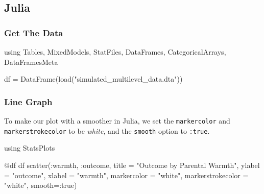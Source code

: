 \documentclass[
  letterpaper,
  DIV=11,
  numbers=noendperiod]{scrreprt}
\newenvironment{Shaded}{\begin{snugshade}}{\end{snugshade}}
\newcommand{\BuiltInTok}[1]{\textcolor[rgb]{0.00,0.23,0.31}{#1}}
\newcommand{\ConstantTok}[1]{\textcolor[rgb]{0.56,0.35,0.01}{#1}}
\newcommand{\FunctionTok}[1]{\textcolor[rgb]{0.28,0.35,0.67}{#1}}
\newcommand{\ImportTok}[1]{\textcolor[rgb]{0.00,0.46,0.62}{#1}}
\newcommand{\NormalTok}[1]{\textcolor[rgb]{0.00,0.23,0.31}{#1}}
\newcommand{\OperatorTok}[1]{\textcolor[rgb]{0.37,0.37,0.37}{#1}}
\newcommand{\PreprocessorTok}[1]{\textcolor[rgb]{0.68,0.00,0.00}{#1}}
\newcommand{\StringTok}[1]{\textcolor[rgb]{0.13,0.47,0.30}{#1}}
\begin{document}
\subsection{Julia}

\subsubsection{Get The Data}\label{get-the-data-5}

\begin{Shaded}
\begin{Highlighting}[]
\ImportTok{using} \BuiltInTok{Tables}\NormalTok{, }\BuiltInTok{MixedModels}\NormalTok{, }\BuiltInTok{StatFiles}\NormalTok{, }\BuiltInTok{DataFrames}\NormalTok{, }\BuiltInTok{CategoricalArrays}\NormalTok{, }\BuiltInTok{DataFramesMeta}

\NormalTok{df }\OperatorTok{=} \FunctionTok{DataFrame}\NormalTok{(}\FunctionTok{load}\NormalTok{(}\StringTok{"simulated\_multilevel\_data.dta"}\NormalTok{))}
\end{Highlighting}
\end{Shaded}

\subsubsection{Line Graph}\label{line-graph-2}

To make our plot with a smoother in Julia, we set the
\texttt{markercolor} and \texttt{markerstrokecolor} to be \emph{white},
and the \texttt{smooth} option to \texttt{:true}.

\begin{Shaded}
\begin{Highlighting}[]
\ImportTok{using} \BuiltInTok{StatsPlots}

\PreprocessorTok{@df}\NormalTok{ df }\FunctionTok{scatter}\NormalTok{(}\OperatorTok{:}\NormalTok{warmth, }\OperatorTok{:}\NormalTok{outcome, }
\NormalTok{               title }\OperatorTok{=} \StringTok{"Outcome by Parental Warmth"}\NormalTok{,}
\NormalTok{               ylabel }\OperatorTok{=} \StringTok{"outcome"}\NormalTok{,}
\NormalTok{               xlabel }\OperatorTok{=} \StringTok{"warmth"}\NormalTok{,}
\NormalTok{               markercolor }\OperatorTok{=} \StringTok{"white"}\NormalTok{,}
\NormalTok{               markerstrokecolor }\OperatorTok{=} \StringTok{"white"}\NormalTok{,}
\NormalTok{               smooth}\OperatorTok{=:}\ConstantTok{true}\NormalTok{)}
\end{Highlighting}
\end{Shaded}
\end{document}
